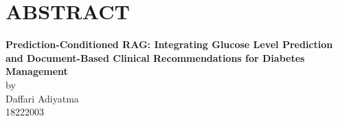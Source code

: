 \chapter*{ABSTRACT}

\begin{center}

    \textbf{Prediction-Conditioned RAG: Integrating Glucose Level Prediction and Document-Based Clinical Recommendations for Diabetes Management} \\
    \vspace{0.4cm}
    by \\
    \vspace{0.4cm}
    Daffari Adiyatma\\
    18222003\\
\end{center}


